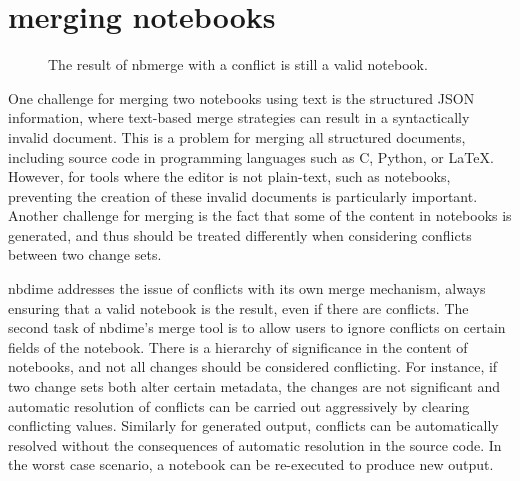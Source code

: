 \documentclass{deliverablereport}
\begin{document}

\section{merging notebooks} %
\label{sec:merging_notebooks}

\begin{figure}
    \center
    \caption{The result of nbmerge with a conflict is still a valid notebook.}
    \label{fig:nbmerge}
\end{figure}

One challenge for merging two notebooks using text is the structured JSON information, where
text-based merge strategies can result in a syntactically invalid document. This is a problem for
merging all structured documents, including source code in programming languages such as C, Python,
or \LaTeX. However, for tools where the editor is not plain-text, such as notebooks, preventing the
creation of these invalid documents is particularly important. Another challenge for merging is the
fact that some of the content in notebooks is generated, and thus should be treated differently
when considering conflicts between two change sets.

nbdime addresses the issue of conflicts with its own merge mechanism, always ensuring that a valid notebook is the result, even if there are conflicts.
The second task of nbdime's merge tool is to allow users to ignore conflicts on certain fields of the notebook.
There is a hierarchy of significance in the content of notebooks,
and not all changes should be considered conflicting.
For instance, if two change sets both alter certain metadata,
the changes are not significant and automatic resolution of conflicts
can be carried out aggressively by clearing conflicting values.
Similarly for generated output, conflicts can be automatically resolved without the consequences of automatic resolution in the source code.
In the worst case scenario, a notebook can be re-executed to produce new output.
\end{document}
